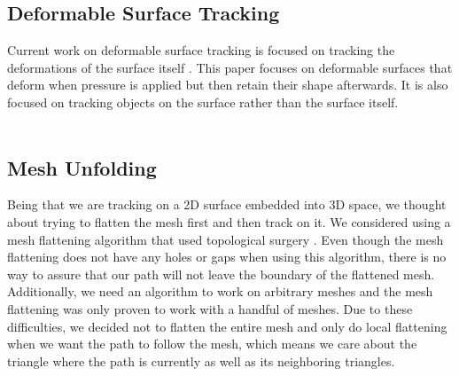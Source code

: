 \subsection{Deformable Surface Tracking}

Current work on deformable surface tracking is focused on tracking the deformations of the surface itself \cite{deformableobjecttracking,convexopt}. This paper focuses on deformable surfaces that deform when pressure is applied but then retain their shape afterwards. It is also focused on tracking objects on the surface rather than the surface itself.\\
\\

\subsection{Mesh Unfolding}

Being that we are tracking on a 2D surface embedded into 3D space, we thought about trying to flatten the mesh first and then track on it. We considered using a mesh flattening algorithm that used topological surgery \cite{meshunfolding}. Even though the mesh flattening does not have any holes or gaps when using this algorithm, there is no way to assure that our path will not leave the boundary of the flattened mesh. Additionally, we need an algorithm to work on arbitrary meshes and the mesh flattening was only proven to work with a handful of meshes. Due to these difficulties, we decided not to flatten the entire mesh and only do local flattening when we want the path to follow the mesh, which means we care about the triangle where the path is currently as well as its neighboring triangles. 